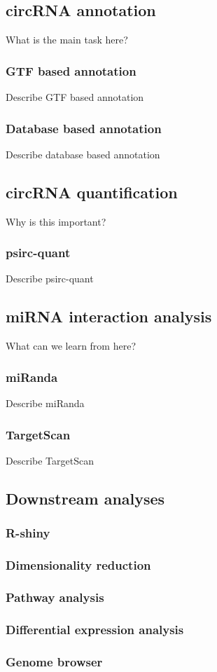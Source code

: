 \subsection{circRNA annotation}
What is the main task here?

\subsubsection{GTF based annotation}
Describe GTF based annotation

\subsubsection{Database based annotation}
Describe database based annotation

\subsection{circRNA quantification}

Why is this important?

\subsubsection{psirc-quant}
Describe psirc-quant

\subsection{miRNA interaction analysis}
What can we learn from here?

\subsubsection{miRanda}
Describe miRanda

\subsubsection{TargetScan}
Describe TargetScan

\subsection{Downstream analyses}
\subsubsection{R-shiny}
\subsubsection{Dimensionality reduction}
\subsubsection{Pathway analysis}
\subsubsection{Differential expression analysis}
\subsubsection{Genome browser}

